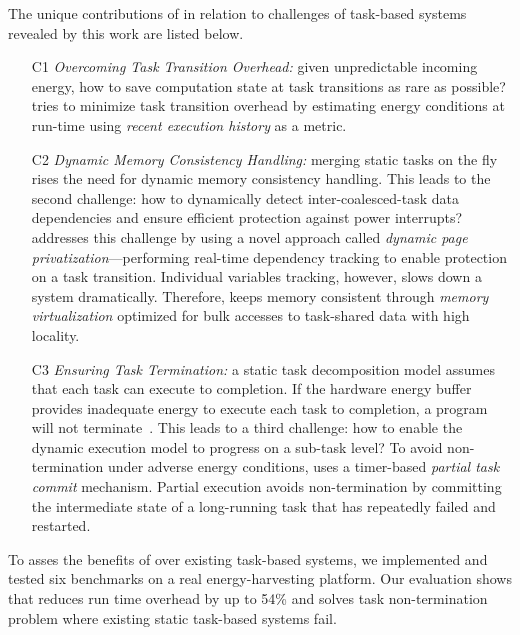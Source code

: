 The unique contributions of \sys in relation to challenges of task-based systems revealed by this work are listed below.

\begin{itemize}

\item[C1] \emph{Overcoming Task Transition Overhead:} given unpredictable incoming energy, how to save computation state at task transitions as rare as possible? \sys tries to minimize task transition overhead by estimating energy conditions at run-time using \emph{recent execution history} as a metric.

\item[C2] \emph{Dynamic Memory Consistency Handling:} merging static tasks on the fly rises  the need for dynamic memory consistency handling. This leads to the second challenge: how to dynamically detect inter-coalesced-task data dependencies and ensure efficient protection against power interrupts? \sys addresses this challenge by using a novel approach called \emph{dynamic page privatization}---performing real-time dependency tracking to enable protection on a task transition. Individual variables tracking, however, slows down a system dramatically. Therefore, \sys keeps memory consistent through \emph{memory virtualization} optimized for bulk accesses to task-shared data with high locality.


\item[C3] \emph{Ensuring Task Termination:} a static task decomposition model assumes that each task can execute to completion. If the hardware energy buffer provides inadequate energy to execute each task to completion, a program will not terminate~\cite{cleancut_2018}. This leads to a third challenge: how to enable the dynamic execution model to progress on a sub-task level? To avoid non-termination under adverse energy conditions, \sys uses a timer-based {\em partial task commit} mechanism. Partial execution avoids non-termination by committing the intermediate state of a long-running task that has repeatedly failed and restarted.

\end{itemize}

To asses the benefits of \sys over existing task-based systems, we implemented and tested six benchmarks on a real energy-harvesting platform. Our evaluation shows that \sys reduces run time overhead by up to 54\% and solves task non-termination problem where existing static task-based systems fail.
 
